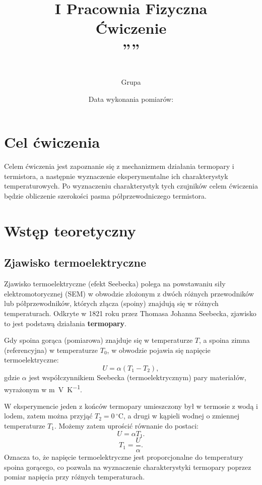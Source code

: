 \documentclass[12pt, a4paper]{article}
\title{
    \large I Pracownia Fizyczna \\[0.5em]
    \textbf{Ćwiczenie \nrCwiczenia} \\[0.3em]
    \LARGE \tytul\space''\codeword''
}
\author{
    \autor\\
     Grupa \nrGrupy}
\date{
    Data wykonania pomiarów: \dataWykonania\\
}
\begin{document}

\maketitle
\thispagestyle{empty}
\newpage

\section{Cel ćwiczenia}

Celem ćwiczenia jest zapoznanie się z mechanizmem działania termopary i
termistora, a następnie wyznaczenie eksperymentalne ich charakterystyk
temperaturowych. Po wyznaczeniu charakterystyk tych czujników celem ćwiczenia
będzie obliczenie szerokości pasma półprzewodniczego termistora.
\section{Wstęp teoretyczny}

\subsection{Zjawisko termoelektryczne}

Zjawisko termoelektryczne (efekt Seebecka) polega na powstawaniu siły
elektromotorycznej (SEM) w obwodzie złożonym z dwóch różnych przewodników lub
półprzewodników, których złącza (spoiny) znajdują się w różnych temperaturach.
Odkryte w 1821 roku przez Thomasa Johanna Seebecka, zjawisko to jest podstawą
działania \textbf{termopary}.

Gdy spoina gorąca (pomiarowa) znajduje się w temperaturze $T$, a spoina zimna
(referencyjna) w temperaturze $T_0$, w obwodzie pojawia się napięcie
termoelektryczne:
\begin{equation}
    U = \alpha (T_1 - T_2),
\end{equation}
gdzie $\alpha$ jest współczynnikiem Seebecka (termoelektrycznym) pary materiałów, wyrażonym w \si{m\volt\per\kelvin}.

W eksperymencie jeden z końców termopary umieszczony był w termosie z wodą i
lodem, zatem można przyjąć $T_2 = 0 \,^\circ\mathrm{C}$, a drugi w kąpieli
wodnej o zmiennej temperaturze $T_1$. Możemy zatem uprościć równanie do
postaci:
\begin{equation}
    U = \alpha T_1.
\end{equation}
\begin{equation}
    T_1 = \frac{U}{\alpha}.
    \label{thermocouple_linreg}
\end{equation}
Oznacza to, że napięcie termoelektryczne jest proporcjonalne do temperatury spoina gorącego, co pozwala na wyznaczenie charakterystyki termopary poprzez pomiar napięcia przy różnych temperaturach.
\end{document}
